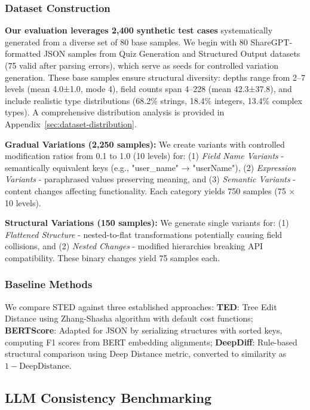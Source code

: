 \documentclass{article}
\begin{document}
\subsubsection{Dataset Construction}

\textbf{Our evaluation leverages 2,400 synthetic test cases} systematically generated from a diverse set of 80 base samples. We begin with 80 ShareGPT-formatted JSON samples from Quiz Generation and Structured Output datasets (75 valid after parsing errors), which serve as seeds for controlled variation generation. These base samples ensure structural diversity: depths range from 2--7 levels (mean 4.0±1.0, mode 4), field counts span 4--228 (mean 42.3±37.8), and include realistic type distributions (68.2\% strings, 18.4\% integers, 13.4\% complex types). A comprehensive distribution analysis is provided in Appendix~\ref{sec:dataset-distribution}.

\textbf{Gradual Variations (2,250 samples):} We create variants with controlled modification ratios from 0.1 to 1.0 (10 levels) for: (1) \textit{Field Name Variants} - semantically equivalent keys (e.g., "user\_name" → "userName"), (2) \textit{Expression Variants} - paraphrased values preserving meaning, and (3) \textit{Semantic Variants} - content changes affecting functionality. Each category yields 750 samples (75 × 10 levels).

\textbf{Structural Variations (150 samples):} We generate single variants for: (1) \textit{Flattened Structure} - nested-to-flat transformations potentially causing field collisions, and (2) \textit{Nested Changes} - modified hierarchies breaking API compatibility. These binary changes yield 75 samples each.

\subsubsection{Baseline Methods}
We compare STED against three established approaches: \textbf{TED}: Tree Edit Distance using Zhang-Shasha algorithm with default cost functions; \textbf{BERTScore}: Adapted for JSON by serializing structures with sorted keys, computing F1 scores from BERT embedding alignments; \textbf{DeepDiff}: Rule-based structural comparison using Deep Distance metric, converted to similarity as $1 - \text{DeepDistance}$.

\subsection{LLM Consistency Benchmarking}
\end{document}
